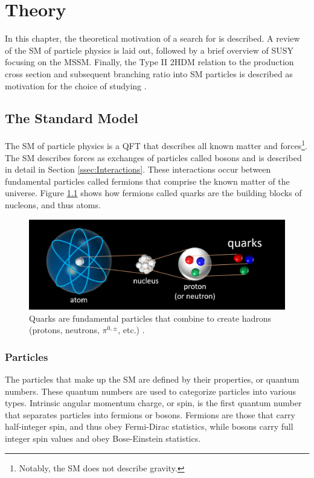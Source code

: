 \chapter{Theory}\label{chap:Theory}
    In this chapter, the theoretical motivation of a search for \HpmLong is described. A review of the \acrfull{SM} of particle physics is laid out, followed by a brief overview of \gls{SUSY} focusing on the \acrfull{MSSM}. Finally, the Type II \acrfull{2HDM} relation to the \Hpm production cross section and subsequent branching ratio into \gls{SM} particles is described as motivation for the choice of studying \HpmLong.

\section{The Standard Model}\label{sec:SM}
	The \gls{SM} of particle physics is a \gls{QFT} that describes all known matter and forces\footnote{Notably, the SM does not describe gravity.}. The \gls{SM} describes forces as exchanges of particles called bosons and is described in detail in Section \ref{ssec:Interactions}. These interactions occur between fundamental particles called fermions that comprise the known matter of the universe. Figure \ref{fig:atom-to-quarks} shows how fermions called quarks are the building blocks of nucleons, and thus atoms.

	\begin{figure}[!ht]
		\centering
		\includegraphics[width=.75\textwidth,keepaspectratio=true]{chapters/chapter2_theory/images/Atom_to_Quark_Cartoon.png}
		\caption{Quarks are fundamental particles that combine to create hadrons (protons, neutrons, $\pi^{0,\pm}$, etc.) \cite{atom-to-quark}.}
		\label{fig:atom-to-quarks}
	\end{figure}

	\subsection{Particles}\label{ssec:Particles}
		The particles that make up the \gls{SM} are defined by their properties, or quantum numbers. These quantum numbers are used to categorize particles into various types. Intrinsic angular momentum charge, or spin, is the first quantum number that separates particles into fermions or bosons. Fermions are those that carry half-integer spin, and thus obey Fermi-Dirac statistics, while bosons carry full integer spin values and obey Bose-Einstein statistics.
		
